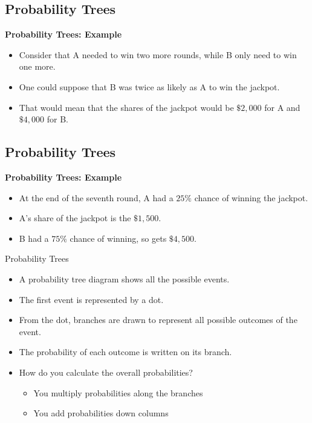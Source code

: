 \subsection{Probability Trees}
{   
\textbf{Probability Trees: Example}
\begin{itemize}
\item Consider that A needed to win two more rounds, while B only need to win one more.
\item One could suppose that B was twice as likely as A to win the jackpot.
\item That would mean that the shares of the jackpot would be $\$2,000$ for A and 
$\$4,000$ for B.
\end{itemize}
}


\subsection{Probability Trees}
{   
\textbf{Probability Trees: Example}
\begin{itemize}
\item At the end of the seventh round, A had a $25\%$ chance of winning the jackpot.
\item A's share of the jackpot is  the $\$1,500$.
\item B had a $75\%$ chance of winning, so gets $\$4,500$.
\end{itemize}
}









{Probability Trees}

\begin{itemize}

\item A probability tree diagram shows all the possible events.
\item The first event is represented by a dot.
\item From the dot, branches are drawn to represent all possible outcomes of the event.
\item The probability of each outcome is written on its branch.
\item How do you calculate the overall probabilities?
\begin{itemize}
\item You multiply probabilities along the branches
\item You add probabilities down columns
\end{itemize}
\end{itemize}

